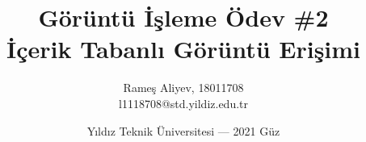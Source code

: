 \title{Görüntü İşleme Ödev \#2\\ İçerik Tabanlı Görüntü Erişimi}
\author{Rameş Aliyev, 18011708\\l1118708@std.yildiz.edu.tr}
\date{Yıldız Teknik Üniversitesi — 2021 Güz}

